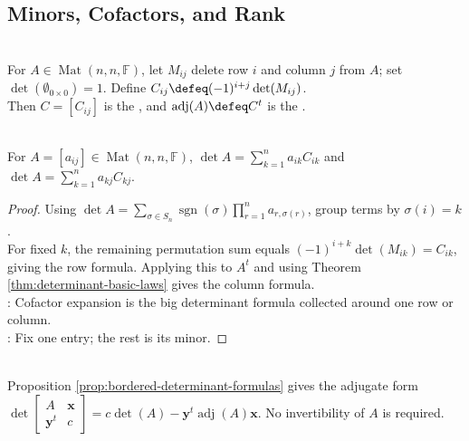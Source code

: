 \subsection{Minors, Cofactors, and Rank}

\begin{definition} \label{def:minors-cofactors-and-adjugate} \\
For $A\in\operatorname{Mat}(n,n,\mathbb{F})$, let $M_{ij}$ delete row $i$ and column $j$ from $A$; set $\det(\emptyset_{0\times0})=1$. Define $C_{ij}\defeq(-1)^{i+j}\det(M_{ij})$.\\
Then $C=[C_{ij}]$ is the , and $\operatorname{adj}(A)\defeq C^t$ is the .
\end{definition}

\begin{lemma} \label{lem:cofactor-expansion} \\
For $A=[a_{ij}]\in\operatorname{Mat}(n,n,\mathbb{F})$, $\det A=\sum\limits_{k=1}^{n}a_{ik}C_{ik}$ and $\det A=\sum\limits_{k=1}^{n}a_{kj}C_{kj}$.
\begin{proof}
Using $\det A=\sum\limits_{\sigma\in S_n}\operatorname{sgn}(\sigma)\prod\limits_{r=1}^n a_{r,\sigma(r)}$, group terms by $\sigma(i)=k$.\\
For fixed $k$, the remaining permutation sum equals $(-1)^{i+k}\det(M_{ik})=C_{ik}$, giving the row formula. Applying this to $A^t$ and using Theorem \ref{thm:determinant-basic-laws} gives the column formula.\\
: Cofactor expansion is the big determinant formula collected around one row or column.\\
: Fix one entry; the rest is its minor.
\end{proof}
\end{lemma}

\begin{remark} \label{rem:bordered-determinant-adjugate-form} \\
Proposition \ref{prop:bordered-determinant-formulas} gives the adjugate form $\det
\begin{bmatrix}
A & \mathbf{x}\\
\mathbf{y}^t & c
\end{bmatrix}
=
c\det(A)-\mathbf{y}^t\operatorname{adj}(A)\mathbf{x}$.
No invertibility of $A$ is required.
\end{remark}

